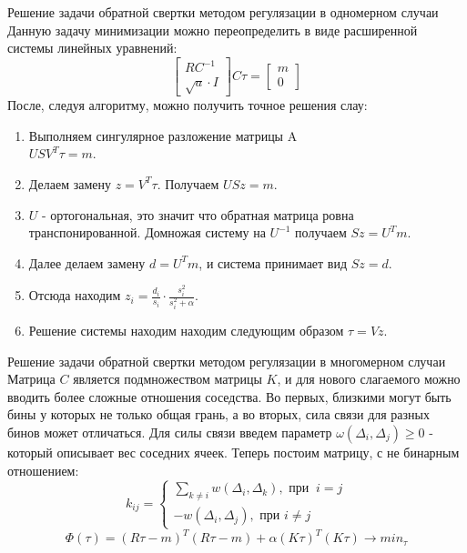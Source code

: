\documentclass[fullscreen=true,russian,compress,%
	hyperref={unicode,bookmarks=false}]{presentation}
\begin{document}
\begin{frame}{Решение задачи обратной свертки методом регулязации в одномерном случаи}
Данную задачу минимизации можно переопределить в виде расширенной системы линейных уравнений:
\begin{equation}
       \begin{bmatrix}
           RC^{-1} \\
           \sqrt{a} \cdot I
       \end{bmatrix}
       C\tau = 
       \begin{bmatrix}
           m \\
           0
       \end{bmatrix}
       \label{system_one_dim}
   \end{equation}
После, следуя алгоритму, можно получить точное решения слау:
\begin{enumerate}
    \item Выполняем сингулярное разложение матрицы A \\
    $USV^T \tau = m.$
    \item Делаем замену $z = V^T\tau$. Получаем $USz = m.$
    \item $U$ - ортогональная, это значит что обратная матрица ровна транспонированной. Домножая систему на $U^{-1}$ получаем $Sz=U^Tm$.
    \item Далее делаем замену $d=U^Tm$, и система принимает вид $Sz=d$.
    \item Отсюда находим $z_{i} = \frac{d_{i}}{s_{i}} \cdot \frac{s^2_{i}}{s^2_{i} + \alpha}$.
    \item Решение системы находим находим следующим образом $\tau = Vz$.
\end{enumerate}
\end{frame}


\begin{frame}{Решение задачи обратной свертки методом регулязации в многомерном случаи}
   Матрица $C$ является подмножеством матрицы $K$, и для нового слагаемого можно вводить более сложные
   отношения соседства. Во первых, близкими могут быть бины у которых не только общая грань, а во вторых, сила связи для разных бинов
   может отличаться. Для силы связи введем параметр $\omega(\Delta_{i}, \Delta_{j}) \geq 0$ - который описывает вес соседних ячеек. 
   Теперь постоим матрицу, с не бинарным отношением:
   \begin{equation}
    k_{ij} =
     \begin{cases}
       \displaystyle\sum_{k\neq i} w(\Delta_{i}, \Delta_{k}), \text{ при } \ i = j \\
       -w( \Delta_{i}, \Delta_{j} ), \text{ при } i \neq j
     \end{cases}
   \end{equation}
   \begin{equation}
      \Phi(\tau)=(R\tau-m)^T (R\tau-m) + \alpha(K\tau)^T(K\tau) \to min_{\tau}
      \label{min_n_dim}
   \end{equation}
\end{frame}
\end{document}
